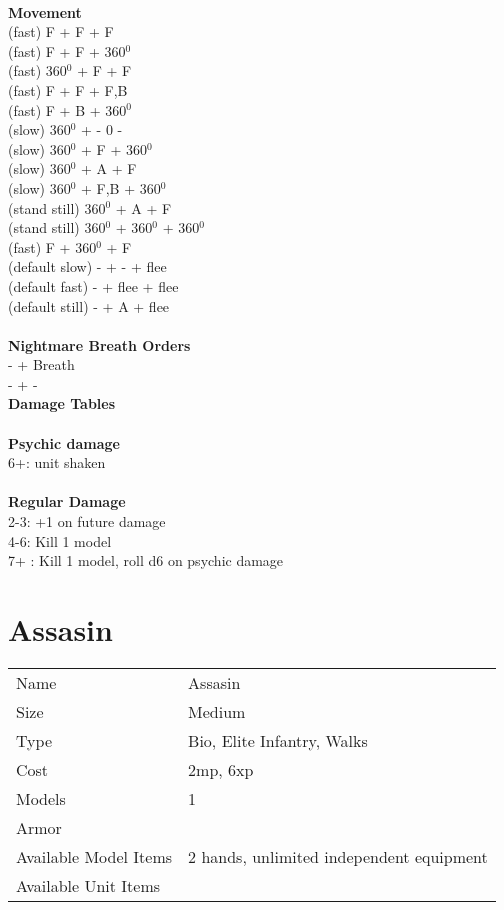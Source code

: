 \ \\ {\bf Movement } \\
(fast) F + F + F  \\
(fast) F + F + 360$^0$ \\
(fast) 360$^0$ + F + F \\
(fast) F + F + F,B \\
(fast) F + B + 360$^0$ \\
(slow) 360$^0$ + - 0 - \\
(slow) 360$^0$ + F + 360$^0$ \\
(slow) 360$^0$ + A + F \\
(slow) 360$^0$ + F,B + 360$^0$ \\
(stand still) 360$^0$ + A + F \\
(stand still) 360$^0$ + 360$^0$ + 360$^0$ \\
(fast) F + 360$^0$ + F \\
(default slow) - + - + flee \\
(default fast) - + flee + flee \\
(default still) - + A + flee \\
\ \\ {\bf Nightmare Breath Orders } \\
- + Breath  \\
- + - \\



{\bf Damage Tables} \\
\ \\ {\bf Psychic damage } \\
6+: unit shaken \\
\ \\ {\bf Regular Damage } \\
2-3: +1 on future damage \\
4-6: Kill 1 model \\
7+ : Kill 1 model, roll d6 on psychic damage \\









\pagebreak

\section{ Assasin }

\begin{tabular}{ll}
  Name & Assasin \\
  Size & Medium\\
  Type & Bio, Elite Infantry, Walks\\
  Cost & 2mp, 6xp\\
  Models & 1\\
  Armor & \\
  Available Model Items & 2 hands, unlimited independent equipment \\
  Available Unit Items &  \\
\end{tabular}


